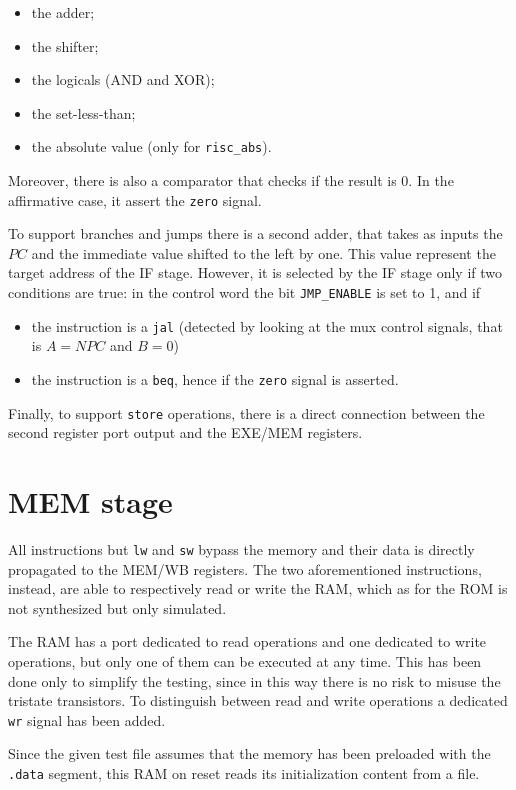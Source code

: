 \begin{itemize}
    \item the adder;
    \item the shifter;
    \item the logicals (AND and XOR);
    \item the set-less-than;
    \item the absolute value (only for \verb|risc_abs|).
\end{itemize}

Moreover, there is also a comparator that checks if the result is 0. In the affirmative case, it assert the \verb|zero| signal.

To support branches and jumps there is a second adder, that takes as inputs the $PC$ and the immediate value shifted to the left
by one. This value represent the target address of the IF stage. However, it is selected by the IF stage only if two conditions
are true: in the control word the bit \verb|JMP_ENABLE| is set to 1, and if

\begin{itemize}
    \item the instruction is a \verb|jal| (detected by looking at the mux control signals, that is $A = NPC$ and $B = 0$)
    \item the instruction is a \verb|beq|, hence if the \verb|zero| signal is asserted.
\end{itemize}

Finally, to support \verb|store| operations, there is a direct connection between the second register port output and the EXE/MEM registers.

\section{MEM stage}
All instructions but \verb|lw| and \verb|sw| bypass the memory and their data is directly propagated to the MEM/WB registers.
The two aforementioned instructions, instead, are able to respectively read or write the RAM, which as for the ROM is not
synthesized but only simulated.

The RAM has a port dedicated to read operations and one dedicated to write operations, but only one of them can be executed
at any time. This has been done only to simplify the testing, since in this way there is no risk to misuse the tristate transistors.
To distinguish between read and write operations a dedicated \verb|wr| signal has been added.

Since the given test file assumes that the memory has been preloaded with the \verb|.data| segment, this RAM on reset
reads its initialization content from a file.


